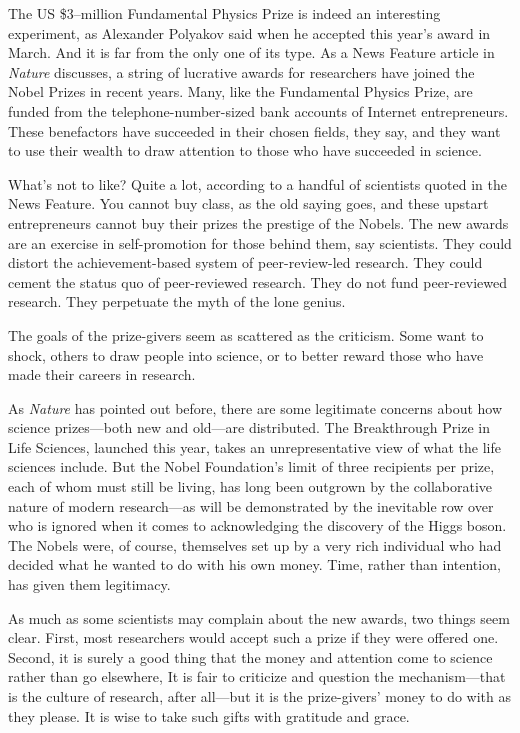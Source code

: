 The US \$3--million Fundamental Physics Prize is indeed an interesting
experiment, as Alexander Polyakov said when he accepted this year's
award in March. And it is far from the only one of its type. As a News
Feature article in \emph{Nature} discusses, a string of lucrative awards
for researchers have joined the Nobel Prizes in recent years. Many, like
the Fundamental Physics Prize, are funded from the
telephone-number-sized bank accounts of Internet entrepreneurs. These
benefactors have succeeded in their chosen fields, they say, and they
want to use their wealth to draw attention to those who have succeeded
in science.

What's not to like? Quite a lot, according to a handful of scientists
quoted in the News Feature. You cannot buy class, as the old saying
goes, and these upstart entrepreneurs cannot buy their prizes the
prestige of the Nobels. The new awards are an exercise in self-promotion
for those behind them, say scientists. They could distort the
achievement-based system of peer-review-led research. They could cement
the status quo of peer-reviewed research. They do not fund peer-reviewed
research. They perpetuate the myth of the lone genius.

The goals of the prize-givers seem as scattered as the criticism. Some
want to shock, others to draw people into science, or to better reward
those who have made their careers in research.

As \emph{Nature} has pointed out before, there are some legitimate concerns
about how science prizes---both new and old---are distributed. The
Breakthrough Prize in Life Sciences, launched this year, takes an
unrepresentative view of what the life sciences include. But the Nobel
Foundation's limit of three recipients per prize, each of whom must
still be living, has long been outgrown by the collaborative nature of
modern research---as will be demonstrated by the inevitable row over who
is ignored when it comes to acknowledging the discovery of the Higgs
boson. The Nobels were, of course, themselves set up by a very rich
individual who had decided what he wanted to do with his own money.
Time, rather than intention, has given them legitimacy.

As much as some scientists may complain about the new awards, two things
seem clear. First, most researchers would accept such a prize if they
were offered one. Second, it is surely a good thing that the money and
attention come to science rather than go elsewhere, It is fair to
criticize and question the mechanism---that is the culture of research,
after all---but it is the prize-givers' money to do with as they please.
It is wise to take such gifts with gratitude and grace.

